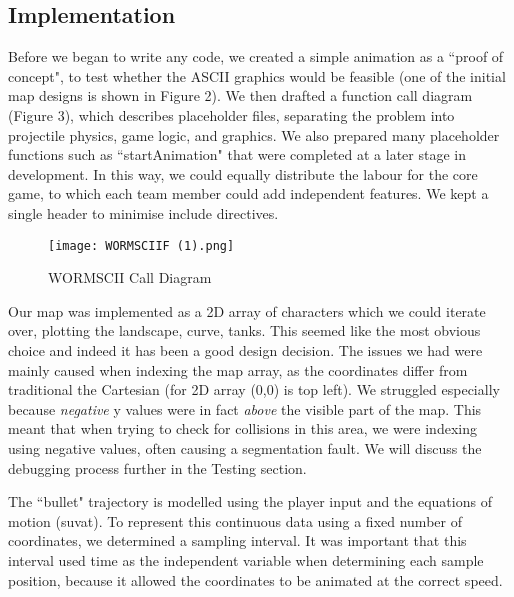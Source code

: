 \documentclass[]{article}
\begin{document}
\subsection*{Implementation}

\vspace{3mm}



Before we began to write any code, we created a simple animation as a ``proof of concept", to test whether the ASCII graphics would be feasible (one of the initial map designs is shown in Figure 2). We then drafted a function call diagram (Figure 3), which describes placeholder files, separating the problem into projectile physics, game logic, and graphics. We also prepared many placeholder functions such as ``startAnimation" that were completed at a later stage in development. In this way, we could equally distribute the labour for the core game, to which each team member could add independent features. We kept a single header to minimise include directives.

\begin{wrapfigure}{L}{0.36\textwidth}
\centering
    \centering
    \vspace{-5mm}
\texttt{[image: WORMSCIIF (1).png]}
    \vspace{-4mm}
  \caption{\label{fig2 :}WORMSCII Call Diagram}
    \vspace{-5mm}
\end{wrapfigure}

\vspace{8mm}

Our map was implemented as a 2D array of characters which we could iterate over, plotting the landscape, curve, tanks. This seemed like the most obvious choice and indeed it has been a good design decision. The issues we had were mainly caused when indexing the map array, as the coordinates differ from traditional the Cartesian (for 2D array (0,0) is top left). We struggled especially because \textit{negative} y values were in fact \textit{above} the visible part of the map. This meant that when trying to check for collisions in this area, we were indexing using negative values, often causing a segmentation fault. We will discuss the debugging process further in the Testing section.

\vspace{3mm}

The ``bullet" trajectory is modelled using the player input and the equations of motion (suvat). To represent this continuous data using a fixed number of coordinates, we determined a sampling interval. It was important that this interval used time as the independent variable when determining each sample position, because it allowed the coordinates to be animated at the correct speed.
\end{document}
